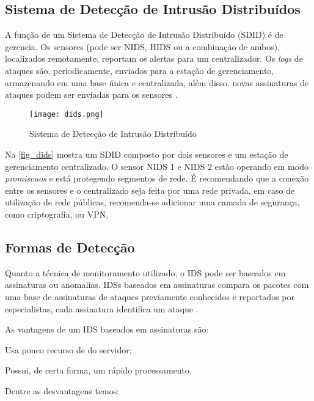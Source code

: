 \subsection{Sistema de Detecção de Intrusão Distribuídos}

A função de um Sistema de Detecção de Intrusão Distribuído (SDID) é de gerencia. Os sensores (pode ser NIDS, HIDS ou a combinação de ambos), localizados remotamente, reportam os alertas para um centralizador. Os \textit{logs} de ataques são, periodicamente, enviados para a estação de gerenciamento, armazenando em uma base única e centralizada, além disso, novas assinaturas de ataques podem ser enviadas para os sensores \cite{snort:andrew}.   

\begin{figure}[!htb]
  \centering
  \caption{Sistema de Detecção de Intrusão Distribuído} \label{fig_dids}
  \texttt{[image: dids.png]}
\end{figure}

Na \autoref{fig_dids} mostra um SDID composto por dois sensores e um estação de gerenciamento centralizado. O sensor NIDS 1 e NIDS 2 estão operando em modo \textit{promiscuos} e está protegendo segmentos de rede. É recomendando que a conexão entre os sensores e o centralizado seja feita por uma rede privada, em caso de utilização de rede públicas, recomenda-se adicionar uma camada de segurança, como criptografia, ou VPN.

\subsection{Formas de Detecção} \label{sec:idps-formas}

Quanto a técnica de monitoramento utilizado, o IDS pode ser baseados em assinaturas ou anomalias. IDSs baseados em assinaturas compara os pacotes com uma base de assinaturas de ataques previamente conhecidos e reportados por especialistas, cada assinatura identifica um ataque \cite{nagahama2012ipsflow}.  

As vantagens de um IDS baseados em assinaturas são:

\begin{alineas}
\item Usa pouco recurso de  do servidor;
\item Possui, de certa forma, um rápido processamento.
\end{alineas}

Dentre as desvantagens temos:


